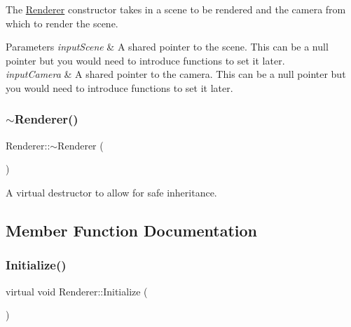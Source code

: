 The \hyperlink{class_renderer}{Renderer} constructor takes in a scene to be rendered and the camera from which to render the scene. 


\begin{DoxyParams}{Parameters}
{\em input\+Scene} & A shared pointer to the scene. This can be a null pointer but you would need to introduce functions to set it later. \\
\hline
{\em input\+Camera} & A shared pointer to the camera. This can be a null pointer but you would need to introduce functions to set it later. \\
\hline
\end{DoxyParams}
\hypertarget{class_renderer_afeee408862d5bd6255a6882d47e6d5cd}{}\label{class_renderer_afeee408862d5bd6255a6882d47e6d5cd} 
\subsubsection{\texorpdfstring{$\sim$\+Renderer()}{~Renderer()}}
{\footnotesize\ttfamily Renderer\+::$\sim$\+Renderer (\begin{DoxyParamCaption}{ }\end{DoxyParamCaption})\hspace{0.3cm}{\ttfamily [virtual]}}



A virtual destructor to allow for safe inheritance. 



\subsection{Member Function Documentation}
\hypertarget{class_renderer_a7cb221f355f181d84d66e8c09f50f04a}{}\label{class_renderer_a7cb221f355f181d84d66e8c09f50f04a} 
\subsubsection{\texorpdfstring{Initialize()}{Initialize()}}
{\footnotesize\ttfamily virtual void Renderer\+::\+Initialize (\begin{DoxyParamCaption}{ }\end{DoxyParamCaption})\hspace{0.3cm}{\ttfamily [pure virtual]}}



